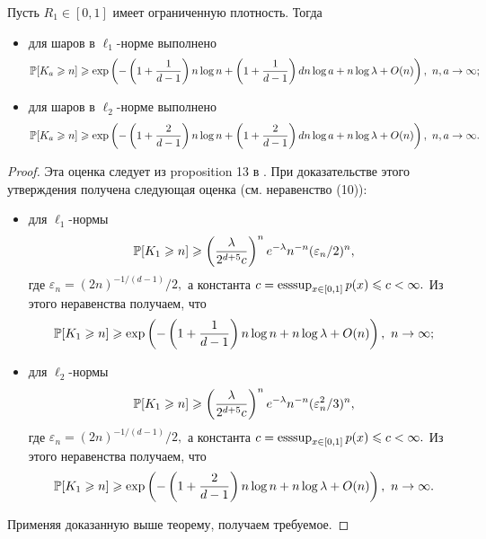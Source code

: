 \begin{cor}
Пусть $R_1\in [0, 1]$ имеет ограниченную плотность. Тогда 
\begin{itemize}
    \item для шаров в $\ell_1$-норме выполнено
    $$\mathbb{P}[K_a \geqslant n] \geqslant \exp \left(-\left(1+\dfrac{1}{d-1}\right)n\log n + \left(1+\dfrac{1}{d-1}\right)dn\log a  +n\log\lambda + O(n)\right),\  n, a\to \infty;$$
    \item для шаров в $\ell_2$-норме выполнено
    $$\mathbb{P}[K_a \geqslant n] \geqslant \exp \left(-\left(1+\dfrac{2}{d-1}\right)n\log n + \left(1+\dfrac{2}{d-1}\right)dn\log a  +n\log\lambda + O(n)\right),\  n, a\to \infty.$$
\end{itemize}
\end{cor}

\begin{proof}
Эта оценка следует из proposition 13 в \cite{AL}. При доказательстве этого утверждения получена следующая оценка (см. неравенство (10)):
\begin{itemize}
    \item для $\ell_1$-нормы 
    $$\mathbb{P}[K_1\geqslant n] \geqslant \left(\dfrac{\lambda}{2^{d+5}c}\right)^ne^{-\lambda}n^{-n}(\varepsilon_n/2)^n,$$ где $\varepsilon_n = (2n)^{-1/(d-1)}/2,$ а константа $c = \operatorname{esssup}_{x\in[0,1]} p(x) \leqslant c < \infty.$ Из этого неравенства получаем, что
    $$\mathbb{P}[K_1 \geqslant n] \geqslant \exp \left(-\left(1+\dfrac{1}{d-1}\right)n\log n + n\log\lambda + O(n)\right),\  n\to \infty;$$
    \item для $\ell_2$-нормы  $$\mathbb{P}[K_1\geqslant n] \geqslant \left(\dfrac{\lambda}{2^{d+5}c}\right)^ne^{-\lambda}n^{-n}(\varepsilon_n^2/3)^n,$$ где $\varepsilon_n = (2n)^{-1/(d-1)}/2,$ а константа $c = \operatorname{esssup}_{x\in[0,1]} p(x) \leqslant c < \infty.$ Из этого неравенства получаем, что
    $$\mathbb{P}[K_1 \geqslant n] \geqslant \exp \left(-\left(1+\dfrac{2}{d-1}\right)n\log n +  n\log\lambda + O(n)\right),\  n\to \infty.$$
\end{itemize}
Применяя доказанную выше теорему, получаем требуемое.
\end{proof}


